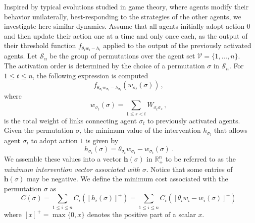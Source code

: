 \documentclass[12pt,twoside,reqno]{amsart}
\theoremstyle{definition}
\numberwithin{equation}{section}
\newcommand{\be}{\begin{equation}}
\newcommand{\ee}{\end{equation}}
\newcommand{\mc}{\mathcal}
\newcommand{\0}{\mathbf{0}}
\newcommand{\1}{\mathbf{1}}
\renewcommand{\S}{\mathcal{S} }
\newcommand{\R}{\mathbb{R}}
\newcommand{\infl}{h}
\newcommand{\Infl}{\mathbf{\infl}}
\newcommand{\thre}{\theta}
\begin{document}

Inspired by typical evolutions studied in game theory, where agents modify their behavior unilaterally, best-responding to the strategies of the other agents, we investigate here similar dynamics. Assume that all agents initially adopt action $0$ and then update their action one at a time and only once each, as the output of their threshold function $f_{\thre_iw_i-\infl_i}$ applied to the output of the previously activated agents. 
%
Let $\S_n$ be the group of permutations over the agent set $\mc V=\{1,\ldots,n\}$. The activation order is determined by the choice of a permutation $\sigma$ in $\S_{n}$. For $1\le t\le n$, the following expression is computed $$f_{\thre_{\sigma_t}w_{\sigma_t}-\infl_{\sigma_t}}(w_{\sigma_t}(\sigma))\,,$$
where
\be\label{weightsigma}w_{\sigma_t}(\sigma)=\sum\limits_{1\le s<t}W_{\sigma_t\sigma_s}\,,\ee
is the total weight of links connecting agent $\sigma_t$ to previously activated agents. 
Given the permutation $\sigma$, the minimum value of the intervention $\infl_{\sigma_t}$ that allows agent $\sigma_t$ to adopt action $1$ is given by
\be\label{intvectorsigma}\infl_{\sigma_t}({\sigma})=\thre_{\sigma_t}w_{\sigma_t}-w_{\sigma_t}(\sigma)\,.\ee
We assemble these values into a vector $\Infl({\sigma})$ in $\R_+^n$ to be referred to as the \emph{minimum intervention vector associated with $\sigma$}. Notice that some entries of $\Infl(\sigma)$ may be negative. We define the minimum cost associated with the permutation $\sigma$ as
\be\label{costsigma}
C(\sigma)=\sum\limits_{1\le i\le n}C_i([\infl_i(\sigma)]^+)=\sum\limits_{1\le i\le n}C_i([\thre_iw_i-w_i(\sigma)]^+)\ee
where $[x]^+=\max\{0,x\}$ denotes the positive part of a scalar $x$.  
\end{document}
